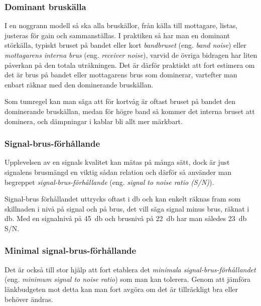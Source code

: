 \subsubsection{Dominant bruskälla}

I en noggrann modell så ska alla bruskällor, från källa till mottagare,
listas, justeras för gain och sammanställas.
I praktiken så har man en dominant störkälla, typiskt bruset på bandet eller
kort \emph{bandbruset} (eng. \emph{band noise}) eller
\emph{mottagarens interna brus} (eng. \emph{receiver noise}),
varvid de övriga bidragen har liten påverkan på den totala uträkningen.
Det är därför praktiskt att fort estimera om det är brus på bandet eller
mottagarens brus som dominerar, vartefter man enbart räknar med den
dominerande bruskällan.

Som tumregel kan man säga att för kortvåg är oftast bruset på bandet
den dominerande bruskällan, medan för högre band så kommer det interna
bruset att dominera, och dämpningar i kablar bli allt mer märkbart.

\subsubsection{Signal-brus-förhållande}

Upplevelsen av en signals kvalitet kan mätas på många sätt, dock är just
signalens brusmängd en viktig sådan relation och därför så använder man
begreppet \emph{signal-brus-förhållande} (eng.
\emph{signal to noise ratio (S/N)}).

Signal-brus förhållandet uttrycks oftast i \unit{\decibel} och kan enkelt räknas
fram som skillnaden i nivå på signal och på brus, det vill säga signal minus
brus, räknat i \unit{\decibel}.
Med en signalnivå på \qty{45}{\decibel} och brusnivå på \qty{22}{\decibel} har man
således \qty{+23}{\decibel} S/N.

\subsubsection{Minimal signal-brus-förhållande}

Det är också till stor hjälp att fort etablera det \emph{minimala
signal-brus-förhållandet} (eng. \emph{minimum signal to noise ratio})
som man kan tolerera.
Genom att jämföra länkbudgeten mot detta kan man fort avgöra om det är
tillräckligt bra eller behöver ändras.

